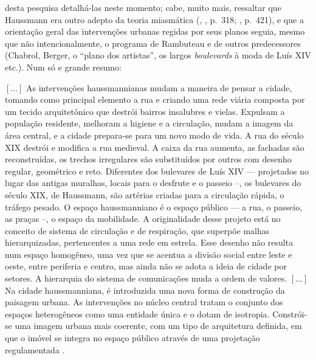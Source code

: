 desta pesquisa detalhá-las neste momento; cabe, muito mais, ressaltar que Haussmann era outro adepto da teoria miasmática (\citeauthor{haussmann1890memoires-2}, \citeyear{haussmann1890memoires-2}, p.~318; \citeyear{haussmann1890memoires-3}, p.~421), e que a orientação geral das intervenções urbanas regidas por seus planos seguia, mesmo que não intencionalmente, o programa de Rambuteau e de outros predecessores (Chabrol, Berger, o ``plano dos artistas'', os largos \textit{boulevards} à moda de Luís XIV etc.). Num só e grande resumo:

\begin{citacao}
\([\dots]\) As intervenções haussmannianas mudam a maneira de pensar a cidade, tomando como principal elemento a rua e criando uma rede viária composta por um tecido arquitetônico que destrói bairros insalubres e vielas. Expulsam a população residente, melhoram a higiene e a circulação, mudam a imagem da área central, e a cidade prepara-se para um novo modo de vida. A rua do século XIX destrói e modifica a rua medieval. A caixa da rua aumenta, as fachadas são reconstruídas, os trechos irregulares são substituídos por outros com desenho regular, geométrico e reto. Diferentes dos bulevares de Luís XIV --- projetados no lugar das antigas muralhas, locais para o desfrute e o passeio --, os bulevares do século XIX, de Haussmann, são artérias criadas para a circulação rápida, o tráfego pesado. O espaço haussmanniano é o espaço público --- a rua, o passeio, as praças --, o espaço da mobilidade. A originalidade desse projeto está no conceito de sistema de circulação e de respiração, que superpõe malhas hierarquizadas, pertencentes a uma rede em estrela. Esse desenho não resulta num espaço homogêneo, uma vez que se acentua a divisão social entre leste e oeste, entre periferia e centro, mas ainda não se adota a ideia de cidade por setores. A hierarquia do sistema de comunicações muda a ordem de valores.
\([\dots]\) Na cidade haussmanniana, é introduzida uma nova forma de construção da paisagem urbana. As intervenções no núcleo central tratam o conjunto dos espaços heterogêneos como uma entidade única e o dotam de isotropia. Constrói-se uma imagem urbana mais coerente, com um tipo de arquitetura definida, em que o imóvel se integra no espaço público através de uma projetação regulamentada \cite[pp.~68,~77]{petti_eurfranba_2011}.
\end{citacao}

